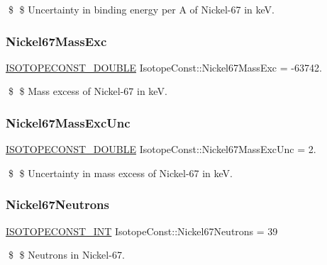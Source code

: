 \$ \$ Uncertainty in binding energy per A of Nickel-\/67 in keV. \mbox{\label{group___isotope_const-_nickel-_ni67_ga4c35df86f0472f077356f4a79d70d26e}} 
\subsubsection{\texorpdfstring{Nickel67\+Mass\+Exc}{Nickel67MassExc}}
{\footnotesize\ttfamily \mbox{\hyperlink{group___isotope_const-_macros_ga8f45a7272ce02c0b4c65c44636ed719a}{I\+S\+O\+T\+O\+P\+E\+C\+O\+N\+S\+T\+\_\+\+D\+O\+U\+B\+LE}} Isotope\+Const\+::\+Nickel67\+Mass\+Exc = -\/63742.}

\$ \$ Mass excess of Nickel-\/67 in keV. \mbox{\label{group___isotope_const-_nickel-_ni67_ga6f2f22dd171391f66f507b862876aa19}} 
\subsubsection{\texorpdfstring{Nickel67\+Mass\+Exc\+Unc}{Nickel67MassExcUnc}}
{\footnotesize\ttfamily \mbox{\hyperlink{group___isotope_const-_macros_ga8f45a7272ce02c0b4c65c44636ed719a}{I\+S\+O\+T\+O\+P\+E\+C\+O\+N\+S\+T\+\_\+\+D\+O\+U\+B\+LE}} Isotope\+Const\+::\+Nickel67\+Mass\+Exc\+Unc = 2.}

\$ \$ Uncertainty in mass excess of Nickel-\/67 in keV. \mbox{\label{group___isotope_const-_nickel-_ni67_ga4e6407c3f669f8500119f057b1890198}} 
\subsubsection{\texorpdfstring{Nickel67\+Neutrons}{Nickel67Neutrons}}
{\footnotesize\ttfamily \mbox{\hyperlink{group___isotope_const-_macros_ga5f18360b3e99483a35c32d789e62621c}{I\+S\+O\+T\+O\+P\+E\+C\+O\+N\+S\+T\+\_\+\+I\+NT}} Isotope\+Const\+::\+Nickel67\+Neutrons = 39}

\$ \$ Neutrons in Nickel-\/67. \mbox{\label{group___isotope_const-_nickel-_ni67_ga0394c58b45fc60757390c5d16478e39b}} 
